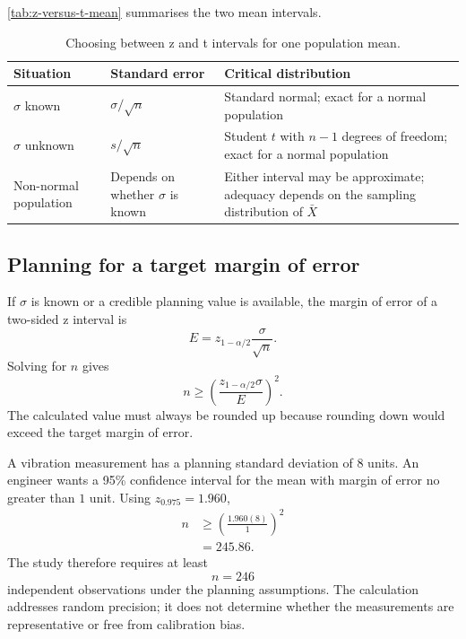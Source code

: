 \autoref{tab:z-versus-t-mean} summarises the two mean intervals.

\begin{table}[htbp]
\centering
\caption{Choosing between z and t intervals for one population mean.}
\label{tab:z-versus-t-mean}
\begin{tabularx}{\textwidth}{@{}l>{\raggedright\arraybackslash}X>{\raggedright\arraybackslash}X@{}}
\toprule
Situation & Standard error & Critical distribution \\
\midrule
$\sigma$ known
& $\sigma/\sqrt n$
& Standard normal; exact for a normal population \\
$\sigma$ unknown
& $s/\sqrt n$
& Student $t$ with $n-1$ degrees of freedom; exact for a normal population \\
Non-normal population
& Depends on whether $\sigma$ is known
& Either interval may be approximate; adequacy depends on the sampling distribution of $\bar X$ \\
\bottomrule
\end{tabularx}
\end{table}

\subsection{Planning for a target margin of error}

If $\sigma$ is known or a credible planning value is available, the margin of error of a two-sided z interval is
\[
    E=z_{1-\alpha/2}\frac{\sigma}{\sqrt n}.
\]
Solving for $n$ gives
\[
    n\geq
    \left(
      \frac{z_{1-\alpha/2}\sigma}{E}
    \right)^2.
\]
The calculated value must always be rounded up because rounding down would exceed the target margin of error.

\newpage

\begin{example}\par
A vibration measurement has a planning standard deviation of $8$ units. An engineer wants a 95\% confidence interval for the mean with margin of error no greater than $1$ unit. Using $z_{0.975}=1.960$,
\[
\begin{aligned}
    n
      &\geq
      \left(\frac{1.960(8)}{1}\right)^2\\
      &=245.86.
\end{aligned}
\]
The study therefore requires at least
\[
    n=246
\]
independent observations under the planning assumptions. The calculation addresses random precision; it does not determine whether the measurements are representative or free from calibration bias.
\end{example}

